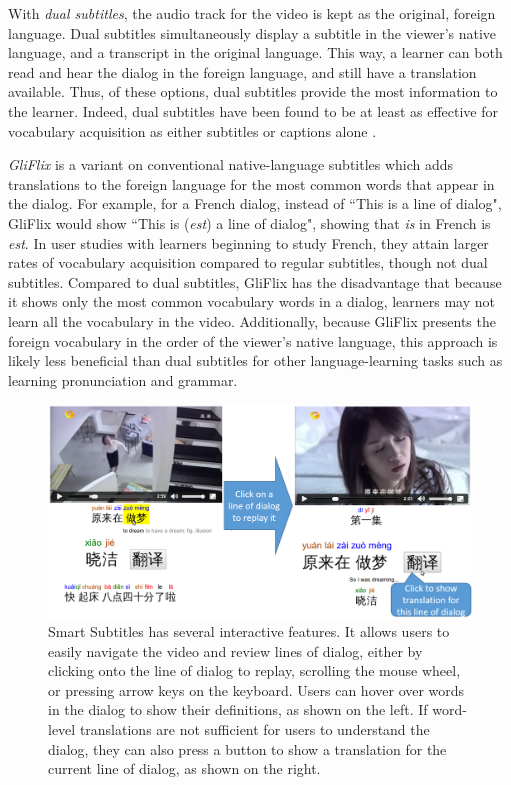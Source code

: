 \documentclass{sigchi}
\begin{document}
With \emph{dual subtitles}, the audio track for the video is kept as the original, foreign language.
Dual subtitles simultaneously display a subtitle in the viewer's native language, and a transcript in the original language. This way, a learner can both read and hear the dialog in the foreign language, and still have a translation
available. Thus, of these options, dual subtitles provide the most information to the learner.
Indeed, dual subtitles have been found to be at least as effective for vocabulary acquisition as
either subtitles or captions alone \cite{raine2012incidental}.

\emph{GliFlix} \cite{gliflix} is a variant on conventional native-language subtitles which adds translations to the foreign language for the most common words that
appear in the dialog. For example, for a French dialog, instead of ``This is a line of dialog", GliFlix would show ``This is (\emph{est}) a line of dialog", showing that \emph{is} in French is \emph{est}. In user studies with learners beginning to study French, they attain larger rates of vocabulary acquisition compared to regular
subtitles, though not dual subtitles. Compared to dual subtitles, GliFlix has the disadvantage that because it shows only the most common vocabulary words in a dialog, learners may not learn all the vocabulary in the video. Additionally, because GliFlix presents the foreign vocabulary in the order of the viewer's native language, this approach is likely less beneficial than dual subtitles for
other language-learning tasks such as learning pronunciation and grammar.

\begin{figure}[t!]
\centering
\includegraphics[width=2\columnwidth]{seekdialog-horizontal-translate}
\caption{Smart Subtitles has several interactive features. It allows users to easily navigate the video and
review lines of dialog, either by clicking onto the line of dialog to replay,
scrolling the mouse wheel,
or pressing arrow keys on the keyboard. Users can hover over words
in the dialog to show their definitions, as shown on the left.
If word-level translations are not sufficient for users to understand the dialog, they can also press a button to show a translation for the current
line of dialog, as shown on the right.}
\label{fig:figure25}
\end{figure}
\end{document}

